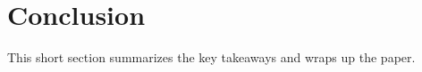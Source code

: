 \section{Conclusion}
\label{sec:conclusion}

This short section summarizes the key takeaways and wraps up the paper.
